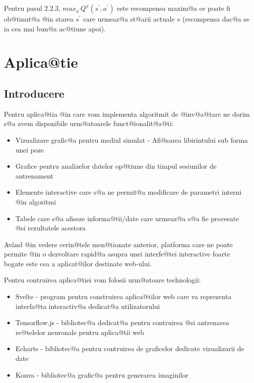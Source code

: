 Pentru pasul 2.2.3, $max_{a^{\prime}} Q^{\pi}(s^{\prime}, a^{\prime})$ este recompensa maxim@a ce poate fi ob@tinut@a @in starea $s^{\prime}$ care urmeaz@a st@arii actuale $s$ (recompensa dac@a se ia cea mai bun@a ac@tiune apoi).

\chapter{Aplica@tie}

\section{Introducere}

Pentru aplica@tia @in care vom implementa algoritmit de @inv@a@tare ne dorim s@a avem disponibile urm@atoarele funct@ionalit@a@ti:

\begin{itemize}
	\item Vizualizare grafic@a pentru mediul simulat - Afi@sarea libirintului sub forma unei poze
	\item Grafice pentru analizelor datelor op@tiune din timpul sesiunilor de antrenament
	\item Elemente interactive care s@a ne permit@a modificare de parametri interni @in algoritmi
	\item Tabele care s@a afiseze informa@tii/date care urmeaz@a s@a fie procesate @si rezultatele acestora
\end{itemize}

Av\^ and @in vedere cerin@tele men@tionate anterior, platforma care ne poate permite @in o dezvoltare rapid@a asupra unei interfe@tei interactive foarte bogate este cea a aplicat@ilor destinate web-ului.

Pentru contruirea aplica@tiei vom folosii urm@atoare technologii:

\begin{itemize}
	\item Svelte - program pentru construirea aplica@tilor web care va reprezenta interfa@ta interactiv@a dedicat@a utilizatorului \cite{Svelte}
	\item Tensorflow.js - bibliotec@a dedicat@a pentru contruirea @si antrenarea re@telelor neuronale pentru aplica@tii web \cite{TensorflowJs}
	\item Echarts - bibliotec@a pentru contruirea de graficelor dedicate vizualizarii de date \cite{Echarts}
	\item Konva - bibliotec@a grafic@a pentru generarea imaginilor \cite{Konva}
\end{itemize} 

